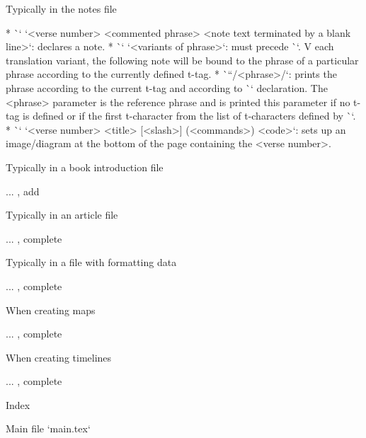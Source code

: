 {{{{\secc Typically in the notes file

\begitems
* \`\Note` `<verse number> {<commented phrase>} <note text terminated by a blank line>`:
  declares a note.
* \`\ww` `<variants of phrase>`: must precede \`\Note`. V
  each translation variant, the following note will be bound to the phrase
  of a particular phrase according to the currently defined t-tag.
* \`\x``/<phrase>/`: prints the phrase according to the current t-tag and according to
  \`\vdef` declaration. The <phrase> parameter is the reference phrase and is printed
  this parameter if no t-tag is defined or if the first
  t-character from the list of t-characters defined by \`\variants`.
* \`\putBot` `<verse number> {<title>} [<slash>] (<commands>) {<code>}`:
  sets up an image/diagram at the bottom of the page containing the <verse number>.
\enditems

\secc Typically in a book introduction file

... \TODO, add

\secc Typically in an article file

... \TODO, complete

\secc Typically in a file with formatting data

... \TODO, complete

\secc When creating maps

... \TODO, complete

\secc When creating timelines

... \TODO, complete




\sec Index

\def\_sortinglang{en}
\typosize[9/]
\makeindex
\endmulti

\bye





 Main file `main.tex`

\begtt
\load[opbible] %
\cslang

\def\shadowparameter{.1}%


}}}}
